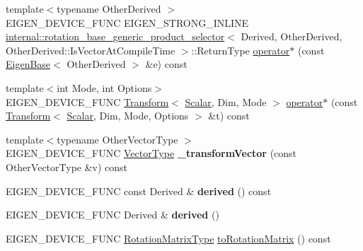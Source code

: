 \begin{DoxyCompactItemize}
\item 
{\footnotesize template$<$typename Other\+Derived $>$ }\\E\+I\+G\+E\+N\+\_\+\+D\+E\+V\+I\+C\+E\+\_\+\+F\+U\+NC E\+I\+G\+E\+N\+\_\+\+S\+T\+R\+O\+N\+G\+\_\+\+I\+N\+L\+I\+NE \hyperlink{struct_eigen_1_1internal_1_1rotation__base__generic__product__selector}{internal\+::rotation\+\_\+base\+\_\+generic\+\_\+product\+\_\+selector}$<$ Derived, Other\+Derived, Other\+Derived\+::\+Is\+Vector\+At\+Compile\+Time $>$\+::Return\+Type \hyperlink{class_eigen_1_1_rotation_base_a68d8b53d31bcfa9fd6b0e24a061bea6c}{operator$\ast$} (const \hyperlink{group___core___module_struct_eigen_1_1_eigen_base}{Eigen\+Base}$<$ Other\+Derived $>$ \&e) const
\item 
{\footnotesize template$<$int Mode, int Options$>$ }\\E\+I\+G\+E\+N\+\_\+\+D\+E\+V\+I\+C\+E\+\_\+\+F\+U\+NC \hyperlink{group___geometry___module_class_eigen_1_1_transform}{Transform}$<$ \hyperlink{class_eigen_1_1_rotation_base_af9b43eac462d7aa70b018efd49c13ef4}{Scalar}, Dim, Mode $>$ \hyperlink{class_eigen_1_1_rotation_base_adf1097a616f0ebf7e78eea9598697672}{operator$\ast$} (const \hyperlink{group___geometry___module_class_eigen_1_1_transform}{Transform}$<$ \hyperlink{class_eigen_1_1_rotation_base_af9b43eac462d7aa70b018efd49c13ef4}{Scalar}, Dim, Mode, Options $>$ \&t) const
\item 
\mbox{\label{class_eigen_1_1_rotation_base_a015ba3b47831570ec525f22b79253bbe}} 
{\footnotesize template$<$typename Other\+Vector\+Type $>$ }\\E\+I\+G\+E\+N\+\_\+\+D\+E\+V\+I\+C\+E\+\_\+\+F\+U\+NC \hyperlink{group___core___module}{Vector\+Type} {\bfseries \+\_\+transform\+Vector} (const Other\+Vector\+Type \&v) const
\item 
\mbox{\label{class_eigen_1_1_rotation_base_a1cae30fa6779f33fb835c91d4c65f54d}} 
E\+I\+G\+E\+N\+\_\+\+D\+E\+V\+I\+C\+E\+\_\+\+F\+U\+NC const Derived \& {\bfseries derived} () const
\item 
\mbox{\label{class_eigen_1_1_rotation_base_a32a9b98ea4ea05b04a5f5f4b138daef8}} 
E\+I\+G\+E\+N\+\_\+\+D\+E\+V\+I\+C\+E\+\_\+\+F\+U\+NC Derived \& {\bfseries derived} ()
\item 
E\+I\+G\+E\+N\+\_\+\+D\+E\+V\+I\+C\+E\+\_\+\+F\+U\+NC \hyperlink{class_eigen_1_1_rotation_base_a83602509674c9d635551998460342951}{Rotation\+Matrix\+Type} \hyperlink{class_eigen_1_1_rotation_base_aac726e89402a427c605514ce31b01e42}{to\+Rotation\+Matrix} () const

\end{DoxyCompactItemize}
